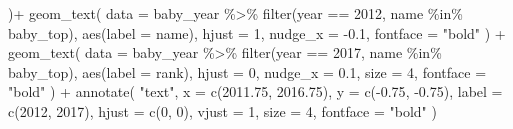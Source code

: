 \documentclass[
  letterpaper,
  DIV=11,
  numbers=noendperiod]{scrreprt}
\newenvironment{Shaded}{\begin{snugshade}}{\end{snugshade}}
\newcommand{\AttributeTok}[1]{\textcolor[rgb]{0.40,0.45,0.13}{#1}}
\newcommand{\DecValTok}[1]{\textcolor[rgb]{0.68,0.00,0.00}{#1}}
\newcommand{\FloatTok}[1]{\textcolor[rgb]{0.68,0.00,0.00}{#1}}
\newcommand{\FunctionTok}[1]{\textcolor[rgb]{0.28,0.35,0.67}{#1}}
\newcommand{\NormalTok}[1]{\textcolor[rgb]{0.00,0.23,0.31}{#1}}
\newcommand{\SpecialCharTok}[1]{\textcolor[rgb]{0.37,0.37,0.37}{#1}}
\newcommand{\StringTok}[1]{\textcolor[rgb]{0.13,0.47,0.30}{#1}}
\begin{document}
\begin{Shaded}
\begin{Highlighting}[]
\NormalTok{  )}\SpecialCharTok{+}
  \FunctionTok{geom\_text}\NormalTok{(}
    \AttributeTok{data =}\NormalTok{ baby\_year }\SpecialCharTok{\%\textgreater{}\%}
    \FunctionTok{filter}\NormalTok{(year }\SpecialCharTok{==} \DecValTok{2012}\NormalTok{, name }\SpecialCharTok{\%in\%}\NormalTok{ baby\_top),}
    \FunctionTok{aes}\NormalTok{(}\AttributeTok{label =}\NormalTok{ name),}
    \AttributeTok{hjust =} \DecValTok{1}\NormalTok{,}
    \AttributeTok{nudge\_x =} \SpecialCharTok{{-}}\FloatTok{0.1}\NormalTok{,}
    \AttributeTok{fontface =} \StringTok{"bold"}
\NormalTok{  ) }\SpecialCharTok{+}
  \FunctionTok{geom\_text}\NormalTok{(}
    \AttributeTok{data =}\NormalTok{ baby\_year }\SpecialCharTok{\%\textgreater{}\%}
      \FunctionTok{filter}\NormalTok{(year }\SpecialCharTok{==} \DecValTok{2017}\NormalTok{, name }\SpecialCharTok{\%in\%}\NormalTok{ baby\_top),}
    \FunctionTok{aes}\NormalTok{(}\AttributeTok{label =}\NormalTok{ rank),}
    \AttributeTok{hjust =} \DecValTok{0}\NormalTok{,}
    \AttributeTok{nudge\_x =} \FloatTok{0.1}\NormalTok{,}
    \AttributeTok{size =} \DecValTok{4}\NormalTok{,}
    \AttributeTok{fontface =} \StringTok{"bold"}
\NormalTok{  ) }\SpecialCharTok{+}
  \FunctionTok{annotate}\NormalTok{(}
    \StringTok{"text"}\NormalTok{,}
    \AttributeTok{x =} \FunctionTok{c}\NormalTok{(}\FloatTok{2011.75}\NormalTok{, }\FloatTok{2016.75}\NormalTok{),}
    \AttributeTok{y =} \FunctionTok{c}\NormalTok{(}\SpecialCharTok{{-}}\FloatTok{0.75}\NormalTok{, }\SpecialCharTok{{-}}\FloatTok{0.75}\NormalTok{),}
    \AttributeTok{label =} \FunctionTok{c}\NormalTok{(}\DecValTok{2012}\NormalTok{, }\DecValTok{2017}\NormalTok{),}
    \AttributeTok{hjust =} \FunctionTok{c}\NormalTok{(}\DecValTok{0}\NormalTok{, }\DecValTok{0}\NormalTok{),}
    \AttributeTok{vjust =} \DecValTok{1}\NormalTok{,}
    \AttributeTok{size =} \DecValTok{4}\NormalTok{,}
    \AttributeTok{fontface =} \StringTok{"bold"}
\NormalTok{  )}
\end{Highlighting}
\end{Shaded}
\end{document}
